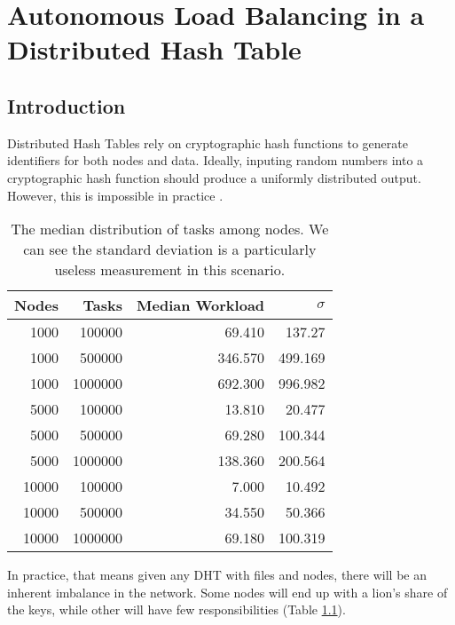 \chapter{Autonomous Load Balancing in a Distributed Hash Table}
\label{chapter:auto-balance}





\section{Introduction}
Distributed Hash Tables rely on cryptographic hash functions to generate identifiers for both nodes and data.
Ideally, inputing random numbers into a cryptographic hash function should produce a uniformly distributed output.
However, this is impossible in practice \cite{hash-outputs} \cite{thomsen2005cryptographic}.


\begin{table}
	\centering
	\caption{The median distribution of tasks among nodes.  We can see the standard deviation is a particularly useless measurement in this scenario.}
	\begin{tabular}{r r r r}
		Nodes & Tasks & Median Workload & $\sigma$ \\ \hline
		1000 & 100000 & 69.410   &  137.27  \\
		1000 & 500000 & 346.570  &  499.169 \\
		1000 &1000000 & 692.300  &  996.982 \\
		
		5000 & 100000  & 13.810 & 20.477 \\ 
		5000 & 500000  & 69.280 & 100.344 \\ 
		5000 & 1000000 &138.360 & 200.564 \\ 
		
		10000 & 100000 & 7.000   &  10.492 \\
		10000 & 500000 & 34.550  &   50.366 \\
		10000 & 1000000& 69.180  &  100.319 \\
	\end{tabular}
	\label{tab:medianLoads}
\end{table}




In practice, that means given any DHT with files and nodes, there will be an inherent imbalance in the network.
Some nodes will end up with a lion's share of the keys, while other will have few responsibilities (Table \ref{tab:medianLoads}).

